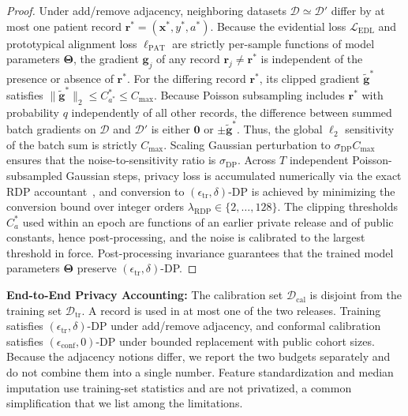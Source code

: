 \documentclass[3p,12pt]{elsarticle}
\theoremstyle{plain}
\theoremstyle{definition}
\begin{document}
\begin{proof}
Under add/remove adjacency, neighboring datasets $\mathcal{D} \simeq \mathcal{D}'$ differ by at most one patient record $\mathbf{r}^* = (\mathbf{x}^*, y^*, a^*)$. Because the evidential loss $\mathcal{L}_{\text{EDL}}$ and prototypical alignment loss $\ell_{\text{PAT}}$ are strictly per-sample functions of model parameters $\boldsymbol{\Theta}$, the gradient $\mathbf{g}_j$ of any record $\mathbf{r}_j \neq \mathbf{r}^*$ is independent of the presence or absence of $\mathbf{r}^*$. For the differing record $\mathbf{r}^*$, its clipped gradient $\tilde{\mathbf{g}}^*$ satisfies $\|\tilde{\mathbf{g}}^*\|_2 \le C_{a^*}^* \le C_{\max}$. Because Poisson subsampling includes $\mathbf{r}^*$ with probability $q$ independently of all other records, the difference between summed batch gradients on $\mathcal{D}$ and $\mathcal{D}'$ is either $\mathbf{0}$ or $\pm \tilde{\mathbf{g}}^*$. Thus, the global $\ell_2$ sensitivity of the batch sum is strictly $C_{\max}$. Scaling Gaussian perturbation to $\sigma_{\text{DP}} C_{\max}$ ensures that the noise-to-sensitivity ratio is $\sigma_{\text{DP}}$. Across $T$ independent Poisson-subsampled Gaussian steps, privacy loss is accumulated numerically via the exact RDP accountant~\cite{mironov2019renyi,wang2019subsampled}, and conversion to $(\epsilon_{\text{tr}}, \delta)$-DP is achieved by minimizing the conversion bound over integer orders $\lambda_{\text{RDP}} \in \{2,\dots,128\}$. The clipping thresholds $C_a^*$ used within an epoch are functions of an earlier private release and of public constants, hence post-processing, and the noise is calibrated to the largest threshold in force. Post-processing invariance guarantees that the trained model parameters $\boldsymbol{\Theta}$ preserve $(\epsilon_{\text{tr}}, \delta)$-DP.
\end{proof}

\noindent \textbf{End-to-End Privacy Accounting:} The calibration set $\mathcal{D}_{\text{cal}}$ is disjoint from the training set $\mathcal{D}_{\text{tr}}$. A record is used in at most one of the two releases. Training satisfies $(\epsilon_{\text{tr}}, \delta)$-DP under add/remove adjacency, and conformal calibration satisfies $(\epsilon_{\text{conf}}, 0)$-DP under bounded replacement with public cohort sizes. Because the adjacency notions differ, we report the two budgets separately and do not combine them into a single number. Feature standardization and median imputation use training-set statistics and are not privatized, a common simplification that we list among the limitations.
\end{document}
